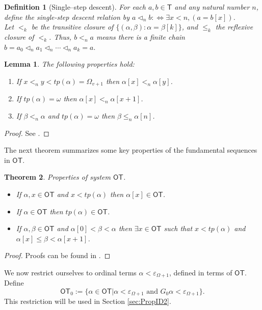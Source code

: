 \documentclass{amsart}
\theoremstyle{plain}
\theoremstyle{plain}
\newtheorem{theorem}{Theorem}
\newtheorem{lemma}[theorem]{Lemma}
\newtheorem*{definition}{Definition}
\newcommand\T{\mathsf{T}}
\newcommand\OT{\mathsf{OT}}
\newcommand{\Om}{{\Omega}}
\newcommand{\al}{{\alpha}}
\newcommand{\be}{{\beta}}
\newcommand{\om}{\omega}
\begin{document}
\begin{definition}[Single–step descent]
For each $a,b \in \T$ and any natural number $n$, define the {\em single-step descent relation} by 
$a \triangleleft_n b :\iff \exists x<n, (a = b[x])$.
\\
Let $<_k$ be the transitive closure of $\{(\al, \be) : \al = \be[k]\}$, and $\leq_k$ the reflexive closure of $<_k$.
Thus, $b<_n a$ means there is a finite chain
$b = a_0\triangleleft_n a_1\triangleleft_n \cdots \triangleleft_n a_k = a.$
\end{definition}


\begin{lemma}\label{lm:propertyTC} The following properties hold:
\begin{enumerate}
    \item If $x<_n y<tp(\al)=\Om_{v+1}$ then $\al[x]<_n \al[y]$.
    \item \label{item:1 lm:propertyTC}If $tp(\al)=\om$ then $\al[x]<_n \al[x+1]$.
    \item  \label{item:2 lm:propertyTC}If $\be <_n \al$ and $tp(\al)=\om$ then $\be\leq_n\al[n]$.
\end{enumerate}
\end{lemma}
\begin{proof}
See \cite{Weiermann95}.
\end{proof}

The next theorem summarizes some key properties of the fundamental sequences in $\OT$.
\begin{theorem}\label{thm:PropFundSeqOT} Properties of system $\OT$.
    \begin{itemize}
        \item If $\al,x \in \OT$ and $x<tp(\al)$ then $\al[x] \in \OT$.
        \item If $\al \in \OT$ then $tp(\al)\in \OT$.
        \item If $\al,\be \in \OT$ and $\al[0]<\be<\al$ then $\exists x \in \OT$ such that $x<tp(\al)$ and $\al[x]\leq \be <\al[x+1]$.
    \end{itemize}
\end{theorem}
\begin{proof}
    Proofs can be found in \cite{BuchholzSchutte}.
\end{proof}

We now restrict ourselves to ordinal terms $\alpha < \varepsilon_{\Omega+1}$, defined in terms of $\OT$.
Define 
$$\OT_0:= \{\al \in \OT | \al< \varepsilon_{\Om+1} \text{ and } G_0\al <\varepsilon_{\Om+1} \}. $$ 
This restriction will be used in Section \ref{sec:PropID2}.
\end{document}
